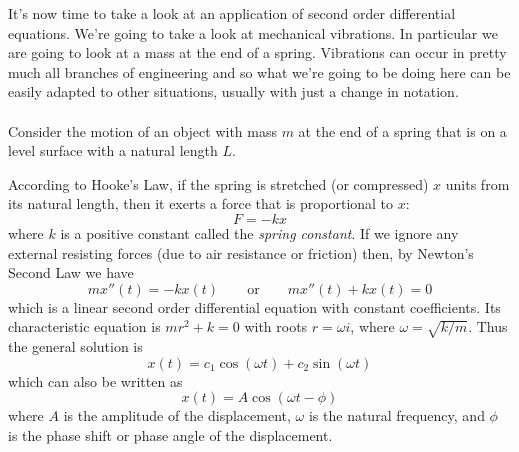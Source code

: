 \documentclass[10pt,reqno]{book}
\theoremstyle{definition}
\begin{document}
	It's now time to take a look at an application of second order differential equations. We're going to take a look at mechanical vibrations. In particular we are going to look at a mass at the end of a spring. Vibrations can occur in pretty much all branches of engineering and so what we're going to be doing here can be easily adapted to other situations, usually with just a change in notation.\\ \\
	Consider the motion of an object with mass $ m $ at the end of a spring that is on a level surface with a natural length $ L $.
	\begin{center}
	\end{center}
	According to Hooke's Law, if the spring is stretched (or compressed) $ x $ units from its natural length, then it exerts a force that is proportional to $x$:
	\[  F = -kx \]
	where $ k $ is a positive constant called the \textit{spring constant}. If we ignore any external resisting forces (due to air resistance or friction) then, by Newton's Second Law we have
	\[ mx''(t) = -kx(t) \qquad \text{or} \qquad mx''(t) + kx(t) = 0 \]
	which is a linear second order differential equation with constant coefficients. Its characteristic equation is $ mr^2 + k = 0 $ with roots $ r = \omega i $, where $ \omega = \sqrt{k/m} $. Thus the general solution is
	\begin{equation}
		x(t) = c_1\cos(\omega t) + c_2\sin(\omega t)
	\end{equation}
	which can also be written as
	\begin{equation}
		x(t) = A\cos(\omega t - \phi)
	\end{equation}
	where $ A $ is the amplitude of the displacement, $ \omega $ is the natural frequency, and $ \phi $ is the phase shift or phase angle of the displacement.\\ \\
\end{document}
